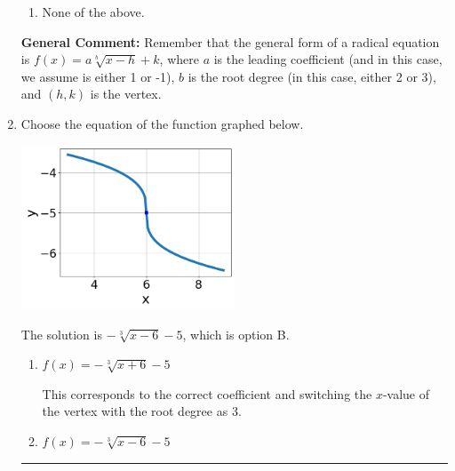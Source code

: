 \documentclass{extbook}[14pt]
\newcommand{\litem}[1]{\item #1

\rule{\textwidth}{0.4pt}}
\begin{document}
\begin{enumerate}
{\begin{enumerate}[label=\Alph*.]
\item None of the above.\end{enumerate}
\textbf{General Comment:} Remember that the general form of a radical equation is $ f(x) = a \sqrt[b]{x - h} + k $, where $a$ is the leading coefficient (and in this case, we assume is either 1 or -1), $b$ is the root degree (in this case, either 2 or 3), and $(h, k)$ is the vertex.
}
\litem{
Choose the equation of the function graphed below.

\begin{center}
    \includegraphics[width=0.5\textwidth]{../Figures/radicalGraphToEquationCopyA.png}
\end{center}


The solution is \( - \sqrt[3]{x - 6} - 5 \), which is option B.\begin{enumerate}[label=\Alph*.]
\item \( f(x) = - \sqrt[3]{x + 6} - 5 \)

This corresponds to the correct coefficient and switching the $x$-value of the vertex with the root degree as $3$.
\item \( f(x) = - \sqrt[3]{x - 6} - 5 \)


\end{enumerate}}
\end{enumerate}
\end{document}
